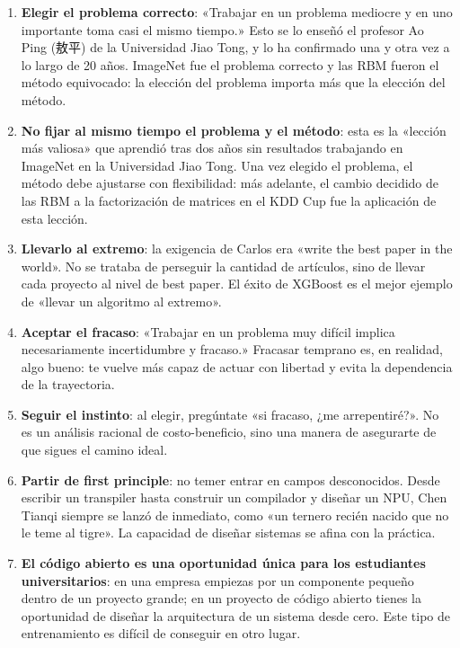 \documentclass[a4paper]{article}
\begin{document}
\begin{enumerate}
    \item \textbf{Elegir el problema correcto}: «Trabajar en un problema mediocre y en uno importante toma casi el mismo tiempo.» Esto se lo enseñó el profesor Ao Ping (敖平) de la Universidad Jiao Tong, y lo ha confirmado una y otra vez a lo largo de 20 años. ImageNet fue el problema correcto y las RBM fueron el método equivocado: la elección del problema importa más que la elección del método.

    \item \textbf{No fijar al mismo tiempo el problema y el método}: esta es la «lección más valiosa» que aprendió tras dos años sin resultados trabajando en ImageNet en la Universidad Jiao Tong. Una vez elegido el problema, el método debe ajustarse con flexibilidad: más adelante, el cambio decidido de las RBM a la factorización de matrices en el KDD Cup fue la aplicación de esta lección.

    \item \textbf{Llevarlo al extremo}: la exigencia de Carlos era «write the best paper in the world». No se trataba de perseguir la cantidad de artículos, sino de llevar cada proyecto al nivel de best paper. El éxito de XGBoost es el mejor ejemplo de «llevar un algoritmo al extremo».

    \item \textbf{Aceptar el fracaso}: «Trabajar en un problema muy difícil implica necesariamente incertidumbre y fracaso.» Fracasar temprano es, en realidad, algo bueno: te vuelve más capaz de actuar con libertad y evita la dependencia de la trayectoria.

    \item \textbf{Seguir el instinto}: al elegir, pregúntate «si fracaso, ¿me arrepentiré?». No es un análisis racional de costo-beneficio, sino una manera de asegurarte de que sigues el camino ideal.

    \item \textbf{Partir de first principle}: no temer entrar en campos desconocidos. Desde escribir un transpiler hasta construir un compilador y diseñar un NPU, Chen Tianqi siempre se lanzó de inmediato, como «un ternero recién nacido que no le teme al tigre». La capacidad de diseñar sistemas se afina con la práctica.

    \item \textbf{El código abierto es una oportunidad única para los estudiantes universitarios}: en una empresa empiezas por un componente pequeño dentro de un proyecto grande; en un proyecto de código abierto tienes la oportunidad de diseñar la arquitectura de un sistema desde cero. Este tipo de entrenamiento es difícil de conseguir en otro lugar.
\end{enumerate}
\end{document}
